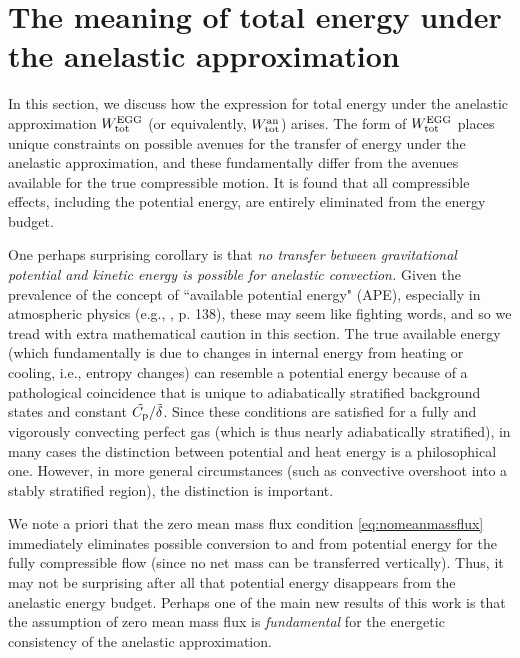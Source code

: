 \documentclass[12pt]{article}
\newcommand{\anwtot}{W^{\rm an}_{\rm tot}}
\newcommand{\eggwtot}{W^{\rm EGG}_{\rm tot}}
\begin{document}
\section{The meaning of total energy under the anelastic approximation}\label{sec:meaningtote}
In this section, we discuss how the expression for total energy under the anelastic approximation $\eggwtot$ (or equivalently, $\anwtot$) arises. The form of $\eggwtot$ places unique constraints on possible avenues for the transfer of energy under the anelastic approximation, and these fundamentally differ from the avenues available for the true compressible motion. It is found that all compressible effects, including the potential energy, are entirely eliminated from the energy budget. 

One perhaps surprising corollary is that \textit{no transfer between gravitational potential and kinetic energy is possible for anelastic convection.} Given the prevalence of the concept of ``available potential energy" (APE), especially in atmospheric physics (e.g., \citealt{Vallis2017}, p. 138), these may seem like fighting words, and so we tread with extra mathematical caution in this section. The true available energy (which fundamentally is due to changes in internal energy from heating or cooling, i.e., entropy changes) can resemble a potential energy because of a pathological coincidence that is unique to adiabatically stratified background states and constant $\tilde{C_{\rm{p}}}/\tilde{\delta}$. Since these conditions are satisfied for a fully and vigorously convecting perfect gas (which is thus nearly adiabatically stratified), in many cases the distinction between potential and heat energy is a philosophical one. However, in more general circumstances (such as convective overshoot into a stably stratified region), the distinction is important. 

We note a priori that the zero mean mass flux condition \eqref{eq:nomeanmassflux} immediately eliminates possible conversion to and from potential energy for the fully compressible flow (since no net mass can be transferred vertically). Thus, it may not be surprising after all that potential energy disappears from the anelastic energy budget. Perhaps one of the main new results of this work is that the assumption of zero mean mass flux is \textit{fundamental} for the energetic consistency of the anelastic approximation. 
\end{document}
